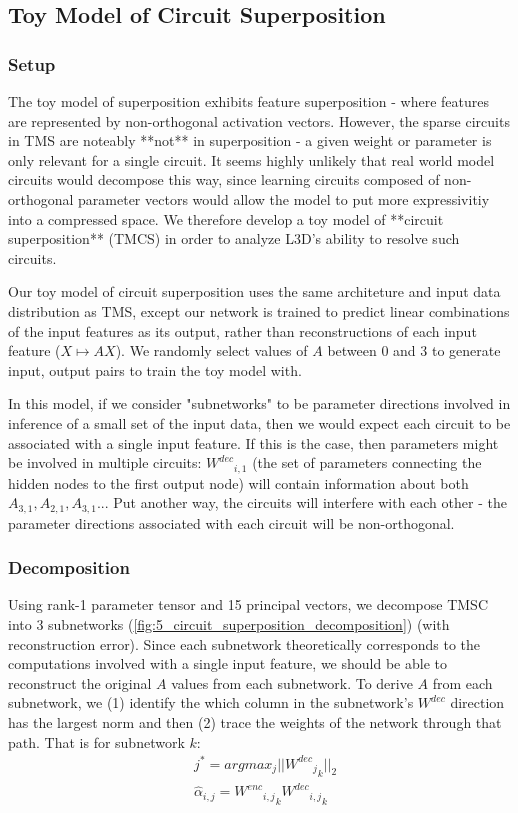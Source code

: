 \documentclass{article}
\theoremstyle{plain}
\theoremstyle{definition}
\theoremstyle{remark}
\begin{document}
\subsection{Toy Model of Circuit Superposition}

\subsubsection{Setup}


The toy model of superposition exhibits feature superposition - where features are represented by non-orthogonal activation vectors. However, the sparse circuits in TMS are noteably **not** in superposition - a given weight or parameter is only relevant for a single circuit. It seems highly unlikely that real world model circuits would decompose this way, since learning circuits composed of non-orthogonal parameter vectors would allow the model to put more expressivitiy into a compressed space. We therefore develop a toy model of **circuit superposition** (TMCS) in order to analyze L3D's ability to resolve such circuits. 

Our toy model of circuit superposition uses the same architeture and input data distribution as TMS, except our network is trained to predict linear combinations of the input features as its output, rather than reconstructions of each input feature ($X \mapsto A X$). We randomly select values of $A$ between 0 and 3 to generate input, output pairs to train the toy model with.

In this model, if we consider "subnetworks" to be parameter directions involved in inference of a small set of the input data, then we would expect each circuit to be associated with a single input feature. If this is the case, then parameters might be involved in multiple circuits: ${W^{dec}}_{i,1}$ (the set of parameters connecting the hidden nodes to the first output node) will contain information about both $A_{3,1}, A_{2,1}, A_{3,1}...$  Put another way, the circuits will interfere with each other - the parameter directions associated with each circuit will be non-orthogonal. 


\subsubsection{Decomposition}


Using rank-1 parameter tensor and 15 principal vectors, we decompose TMSC into 3 subnetworks (\ref{fig:5_circuit_superposition_decomposition}) (with  reconstruction error). Since each subnetwork theoretically corresponds to the computations involved with a single input feature, we should be able to reconstruct the original $A$ values from each subnetwork. To derive $A$ from each subnetwork, we (1) identify the which column in the subnetwork's $W^{dec}$ direction has the largest norm and then (2) trace the weights of the network through that path. That is for subnetwork $k$: 
\begin{align}
    &j^* = argmax_{j} ||{{{W^{dec}}_j}_k}||_2 \\
    &\hat{\alpha}_{i,j} = {{{W^{enc}}_{i,j}}}_k {{W^{dec}}_{i,j}}_k
\end{align}
\end{document}
